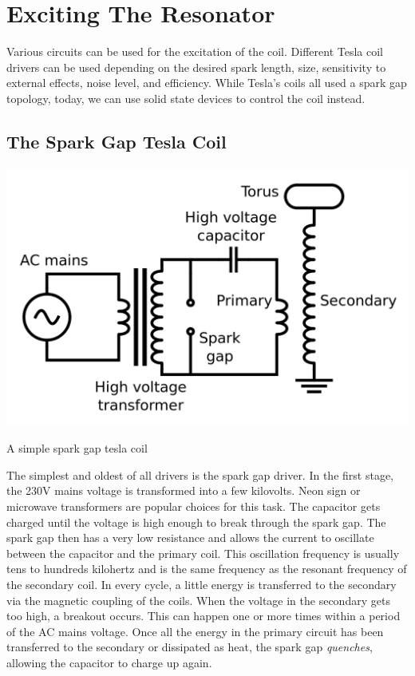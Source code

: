 \section{Exciting The Resonator}

Various circuits can be used for the excitation of the coil. Different Tesla coil drivers can be used depending on the desired spark length, size, sensitivity to external effects, noise level, and efficiency. While Tesla's coils all used a spark gap topology, today, we can use solid state devices to control the coil instead.

\subsection{The Spark Gap Tesla Coil}

\begin{marginfigure}
\includegraphics[width=\textwidth]{simon/resources/sparkGapTeslaCoil.png}
\caption{A simple spark gap tesla coil}
\end{marginfigure}

The simplest and oldest of all drivers is the spark gap driver. In the first stage, the 230V mains voltage is transformed into a few kilovolts. Neon sign or microwave transformers are popular choices for this task. The capacitor gets charged until the voltage is high enough to break through the spark gap. The spark gap then has a very low resistance and allows the current to oscillate between the capacitor and the primary coil. This oscillation frequency is usually tens to hundreds kilohertz and is the same frequency as the resonant frequency of the secondary coil. In every cycle, a little energy is transferred to the secondary via the magnetic coupling of the coils. When the voltage in the secondary gets too high, a breakout occurs. This can happen one or more times within a period of the AC mains voltage. Once all the energy in the primary circuit has been transferred to the secondary or dissipated as heat, the spark gap \emph{quenches}, allowing the capacitor to charge up again.

